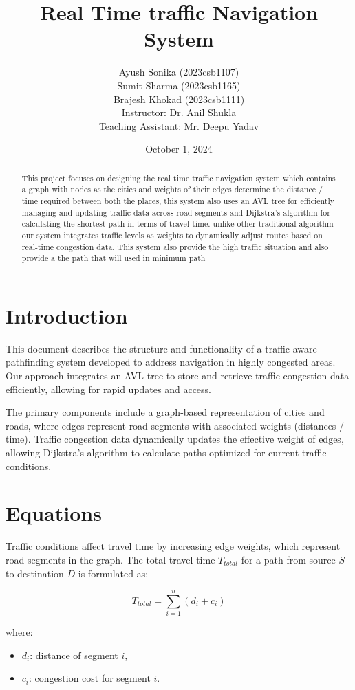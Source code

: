 \documentclass{article}
\title{Real Time traffic Navigation System}
\author{
Ayush Sonika (2023csb1107) \\
Sumit Sharma (2023csb1165) \\
Brajesh Khokad (2023csb1111) \\
Instructor: Dr. Anil Shukla \\
Teaching Assistant: Mr. Deepu Yadav
}
\date{October 1, 2024}
\begin{document}
\maketitle

\begin{abstract}
This project focuses on designing the real time traffic navigation system which contains a graph with nodes as the cities and weights of their edges determine the distance / time required between both the places, this system also uses an AVL tree for efficiently managing and updating traffic data across road segments and  Dijkstra's algorithm for calculating the shortest path in terms of travel time. unlike other traditional algorithm our  system integrates traffic levels as weights to dynamically adjust routes based on real-time congestion data. This system also provide the high traffic situation and also provide a the path that will used in minimum path

\end{abstract}

\section{Introduction}
This document describes the structure and functionality of a traffic-aware pathfinding system developed to address navigation in highly congested areas. Our approach integrates an AVL tree to store and retrieve traffic congestion data efficiently, allowing for rapid updates and access.

The primary components include a graph-based representation of cities and roads, where edges represent road segments with associated weights (distances / time). Traffic congestion data dynamically updates the effective weight of edges, allowing Dijkstra's algorithm to calculate paths optimized for current traffic conditions.

\section{Equations}
Traffic conditions affect travel time by increasing edge weights, which represent road segments in the graph. The total travel time \( T_{total} \) for a path from source \( S \) to destination \( D \) is formulated as:

\[
T_{total} = \sum_{i=1}^{n} \left( d_i + c_i \right)
\]

where:
\begin{itemize}
    \item \( d_i \): distance of segment \( i \),
    \item \( c_i \): congestion cost for segment \( i \).
\end{itemize}
\end{document}
